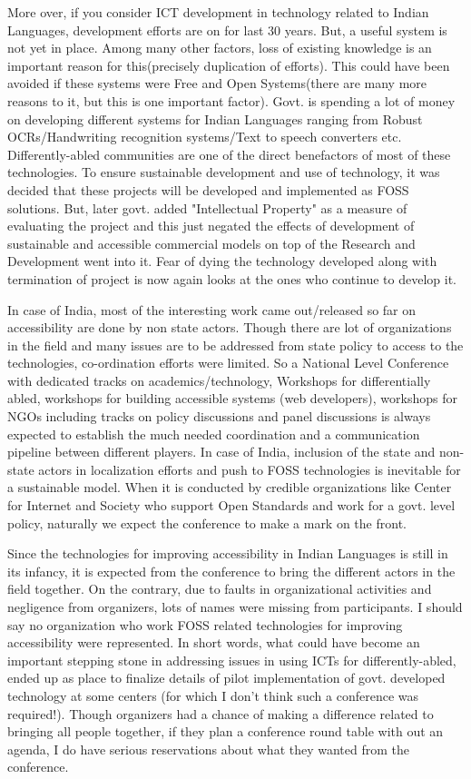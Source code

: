 More over, if you consider ICT development in technology related to Indian Languages, development efforts are on for last 30 years. But, a useful system is not yet in place. Among many other factors, loss of existing knowledge is an important reason for this(precisely duplication of efforts). This could have been avoided if these systems were Free and Open Systems(there are many more reasons to it, but this is one important factor). Govt. is spending a lot of money on developing different systems for Indian Languages ranging from Robust OCRs/Handwriting recognition systems/Text to speech converters etc. Differently-abled communities are one of the direct benefactors of most of these technologies. To ensure sustainable development and use of technology, it was decided that these projects will be developed and implemented as FOSS solutions. But, later govt. added "Intellectual Property" as a measure of evaluating the project and this just negated the effects of development of sustainable and accessible commercial models on top of the Research and Development went into it. Fear of dying the technology developed along with termination of project is now again looks at the ones who continue to develop it. 

In case of India, most of the interesting work came out/released so far on accessibility are done by non state actors. Though there are lot of organizations in the field and many issues are to be addressed from state policy to access to the technologies, co-ordination efforts were limited. So a National Level Conference with dedicated tracks on academics/technology, Workshops for differentially abled, workshops for building accessible systems (web developers), workshops for NGOs including tracks on policy discussions and panel discussions is always expected to establish the much needed coordination and a communication pipeline between different players. In case of India, inclusion of the state and non-state actors in localization efforts and push to FOSS technologies is inevitable for a sustainable model. When it is conducted by credible organizations like Center for Internet and Society who support Open Standards and work for a govt. level policy, naturally we expect the conference to make a mark on the front. 

Since the technologies for improving accessibility in Indian Languages is still in its infancy, it is expected from the conference to bring the different actors in the field together. On the contrary, due to faults in organizational activities and negligence from organizers, lots of names were missing from participants. I should say no organization who work FOSS related technologies for improving accessibility were represented. In short words, what could have become an important stepping stone in addressing issues in using ICTs for differently-abled, ended up as place to finalize details of pilot implementation of govt. developed technology at some centers (for which I don't think such a conference was required!). Though organizers had a chance of making a difference related to bringing all people together, if they plan a conference round table with out an agenda, I do have serious reservations about what they wanted from the conference.


